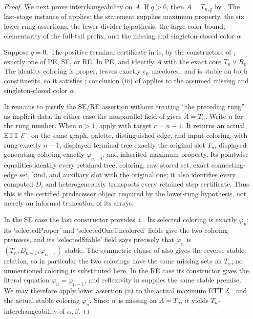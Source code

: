 \begin{proof}
We next prove interchangeability on $A$.  If $q>0$, then
$A=T_{n,q}$ by .  The last-stage instance
of  applies: the statement supplies maximum property,
the six lower-rung assertions, the fewer-divider hypothesis, the
large-color bound, elementarity of the full-tail prefix, and the
missing and singleton-closed color $\alpha$.

Suppose $q=0$.  The positive terminal certificate in
 is, by the constructors of
, exactly one of PE, SE, or RE.  In PE,
 and  identify
$A$ with the exact core $T_n\vee R_n$.  The identity coloring is proper,
leaves exactly $e_0$ uncolored, and is stable on both constituents, so
it satisfies ; conclusion (iii) of
 applies to the assumed missing and singleton-closed
color $\alpha$.

It remains to justify the SE/RE assertion without treating ``the
preceding rung'' as implicit data.  In either case the nonparallel field
of  gives $A=T_n$.  Write $n$ for the rung number.
When $n>1$, apply  with target
$r=n-1$.  It returns an actual ETT $\mathcal E^{-}$ on the same graph,
palette, distinguished edge, and input coloring, with rung exactly
$n-1$, displayed terminal tree exactly the original slot $T_n$,
displayed generating coloring exactly $\varphi_{n-1}$, and inherited
maximum property.  Its pointwise equalities identify every retained tree,
coloring, raw stored set, exact connecting-edge set, kind, and auxiliary
slot with the original one; it also identifies every computed $D_i$ and
heterogeneously transports every retained step certificate.  Thus this is
the certified predecessor object required by the lower-rung hypothesis,
not merely an informal truncation of its arrays.

In the SE case the last constructor provides a
.  Its selected coloring is exactly
$\varphi_n$; its `selectedProper' and `selectedOneUncolored' fields give
the two coloring premises, and its `selectedStable' field says precisely
that $\varphi_n$ is
$(T_n,D_{n-1},\varphi_{n-1})$-stable.  The symmetric clause of
 also gives the reverse stable relation, so in particular
the two colorings have the same missing sets on $T_n$; no unmentioned
coloring is substituted here.  In the RE case its constructor gives the
literal equation $\varphi_n=\varphi_{n-1}$, and reflexivity in
 supplies the same stable premise.  We may therefore apply
lower assertion (ii) to the actual maximum ETT $\mathcal E^{-}$ and the
actual stable coloring $\varphi_n$.  Since $\alpha$ is missing on
$A=T_n$, it yields $T_n$-interchangeability of $\alpha,\beta$.


\end{proof}
